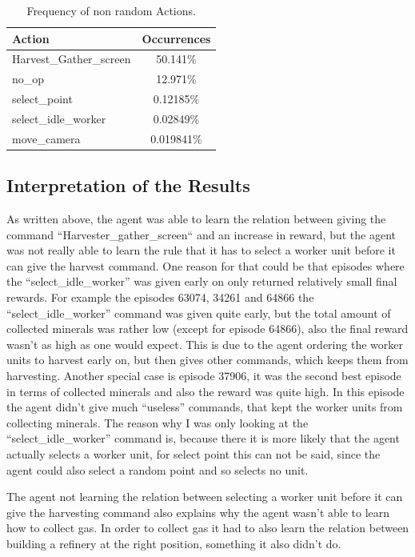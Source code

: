 \documentclass{article}
\begin{document}
\begin{table}
\begin{tabular}{|l|c|}
\hline
Action & Occurrences \\
\hline
Harvest\_Gather\_screen & 50.141\% \\
no\_op & 12.971\% \\
select\_point & 0.12185\% \\
select\_idle\_worker & 0.02849\% \\
move\_camera & 0.019841\% \\
\hline
\end{tabular}
\caption{Frequency of non random Actions.}
\label{non_random_actions}
\end{table}

\subsection{Interpretation of the Results}
As written above, the agent was able to learn the relation between giving the 
command ``Harvester\_gather\_screen`` and an increase in reward, but the agent 
was not really able to learn the rule that it has to select a worker unit 
before it can give the harvest command. One reason for that could be that 
episodes where the ``select\_idle\_worker'' was given early on only returned 
relatively small final rewards. For example the episodes 63074, 34261 and 64866 
the ``select\_idle\_worker'' command was given quite early, but the total 
amount of collected minerals was rather low (except for episode 64866), also 
the final reward wasn't as high as one would expect. This is due to the agent 
ordering the worker units to harvest early on, but then gives other commands, 
which keeps them from harvesting. Another special case is episode 37906, it was 
the second best episode in terms of collected minerals and also the reward was 
quite high. In this episode the agent didn't give much ``useless'' commands, 
that kept the worker units from collecting minerals. The reason why I was only 
looking at the ``select\_idle\_worker'' command is, because there it is more 
likely that the agent actually selects a worker unit, for select point this can 
not be said, since the agent could also select a random point and so selects no 
unit.

The agent not learning the relation between selecting a worker unit before it 
can give the harvesting command also explains why the agent wasn't able to 
learn how to collect gas. In order to collect gas it had to also learn the 
relation between building a refinery at the right position, something it also 
didn't do.
\end{document}
